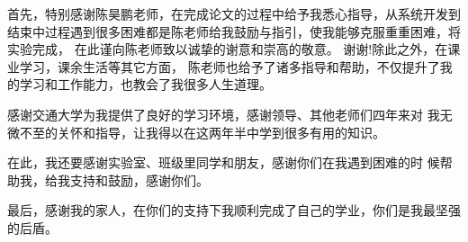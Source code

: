 \begin{thanks}
首先，特别感谢陈昊鹏老师，在完成论文的过程中给予我悉心指导，从系统开发到结束中过程遇到很多困难都是陈老师给我鼓励与指引，使我能够克服重重困难，将实验完成，
在此谨向陈老师致以诚挚的谢意和崇高的敬意。 谢谢!除此之外，在课业学习，课余生活等其它方面，
陈老师也给予了诸多指导和帮助，不仅提升了我的学习和工作能力，也教会了我很多人生道理。

感谢交通大学为我提供了良好的学习环境，感谢领导、其他老师们四年来对 我无微不至的关怀和指导，让我得以在这两年半中学到很多有用的知识。

在此，我还要感谢实验室、班级里同学和朋友，感谢你们在我遇到困难的时 候帮助我，给我支持和鼓励，感谢你们。

最后，感谢我的家人，在你们的支持下我顺利完成了自己的学业，你们是我最坚强的后盾。
\end{thanks}
